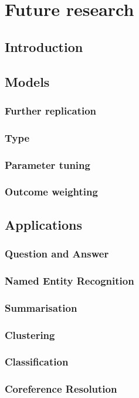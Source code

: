 \chapter{Future research }

\section{Introduction}


\section{Models}

\subsection{Further replication}
\subsection{Type}
\subsection{Parameter tuning}
\subsection{Outcome weighting}


\section{Applications}
\subsection{Question and Answer}
\subsection{Named Entity Recognition}
\subsection{Summarisation}
\subsection{Clustering}
\subsection{Classification}
\subsection{Coreference Resolution}


